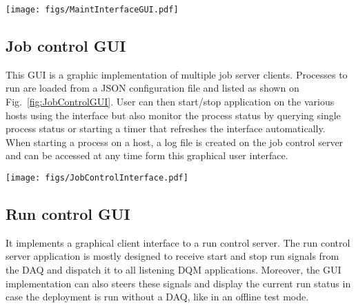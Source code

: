 \documentclass[journal]{IEEEtran}
\begin{document}
\begin{figure*}[htbp]
  \begin{center}
    \texttt{[image: figs/MaintInterfaceGUI.pdf]}
    \caption{\label{fig:DQMMainViz} Main window of the monitoring GUI.
    1. Option for manual/auto update.
    2. Monitor Elements (ME) organized in a tree-like structure
    3. List of displayed ME customizable via dedicated GUI with available ME (coming from analysis modules currently loaded)
    4. Drawing section for ME, can be organized in multiple tabs.
    5. Drawn ME are interactive, here ROOT[3] object that can be manipulated (zoom, change scale, fit, save, etc.)
    }
  \end{center}
\end{figure*}

\subsection{Job control GUI}

This GUI is a graphic implementation of multiple job server clients. Processes to run are loaded from a JSON configuration file and listed as shown on Fig.~\ref{fig:JobControlGUI}. User can then start/stop application on the various hosts using the interface but also monitor the process status by querying single process status or starting a timer that refreshes the interface automatically. When starting a process on a host, a log file is created on the job control server and can be accessed at any time form this graphical user interface.

\begin{figure*}[htbp]
  \begin{center}
    \texttt{[image: figs/JobControlInterface.pdf]}
    \caption{\label{fig:JobControlGUI} Job interface main window. Applications are ordered by host.}
  \end{center}
\end{figure*}

\subsection{Run control GUI}

It implements a graphical client interface to a run control server. The run control server application is mostly designed to receive start and stop run signals from the DAQ and dispatch it to all listening DQM applications. Moreover, the GUI implementation can also steers these signals and display the current run status in case the deployment is run without a DAQ, like in an offline test mode.
\end{document}

